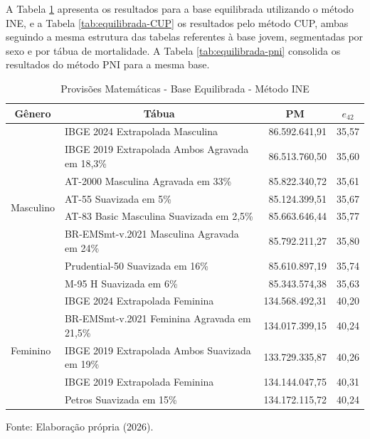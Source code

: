 A Tabela \ref{tab:equilibrada-ine} apresenta os resultados para a base equilibrada utilizando o método INE, e a Tabela \ref{tab:equilibrada-CUP} os resultados pelo método CUP, ambas seguindo a mesma estrutura das tabelas referentes à base jovem, segmentadas por sexo e por tábua de mortalidade. A Tabela \ref{tab:equilibrada-pni} consolida os resultados do método PNI para a mesma base.
\vspace{0.25cm}
\begin{table}[htbp]
    \centering
    \caption{Provisões Matemáticas - Base Equilibrada - Método INE}
    \begin{threeparttable}
    \renewcommand{\arraystretch}{1.0}
    \begin{tabular}{llrr}
    \toprule
    \multicolumn{1}{c}{\textbf{Gênero}} & \multicolumn{1}{c}{\textbf{Tábua}} & \multicolumn{1}{c}{\textbf{PM}} & \multicolumn{1}{c}{\textbf{$e_{42}$}} \\ \midrule
    \multirow{8}{*}{Masculino} & IBGE 2024 Extrapolada Masculina & 86.592.641,91	& 35,57 \\
                                & IBGE 2019 Extrapolada Ambos Agravada em 18,3\% & 86.513.760,50 & 35,60 \\
                                & AT-2000 Masculina Agravada em 33\% & 85.822.340,72 & 35,61 \\
                                & AT-55 Suavizada em 5\% & 85.124.399,51 & 35,67 \\
                                & AT-83 Basic Masculina Suavizada em 2,5\% & 85.663.646,44 & 35,77 \\
                                & BR-EMSmt-v.2021 Masculina Agravada em 24\% & 85.792.211,27 & 35,80 \\
                                & Prudential-50 Suavizada em 16\% & 85.610.897,19 & 35,74 \\
                                & M-95 H Suavizada em 6\% & 85.343.574,38 & 35,63 \\ \hline
    \multirow{5}{*}{Feminino} & IBGE 2024 Extrapolada Feminina& 134.568.492,31 & 40,20 \\
                                & BR-EMSmt-v.2021 Feminina Agravada em 21,5\% & 134.017.399,15 & 40,24 \\
                                & IBGE 2019 Extrapolada Ambos Suavizada em 19\% & 133.729.335,87 & 40,26 \\
                                & IBGE 2019 Extrapolada Feminina & 134.144.047,75 & 40,31 \\
                                & Petros Suavizada em 15\% & 134.172.115,72 & 40,24 \\ \bottomrule
    \end{tabular}
    \begin{tablenotes}[flushleft]
        \small
        \item Fonte: Elaboração própria (2026).
    \end{tablenotes}
    \end{threeparttable}
    \label{tab:equilibrada-ine}
\end{table}
